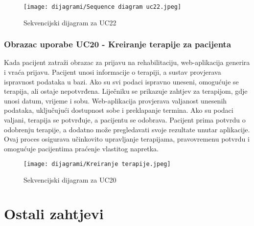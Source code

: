                     \begin{figure}[H]
			         \texttt{[image: dijagrami/Sequence diagram uc22.jpeg]}
			         \centering
			         \caption{Sekvencijski dijagram za UC22}
			         \label{fig:SequenceDiagram2}
		          \end{figure}
                
				\eject
				
				\subsubsection{Obrazac uporabe UC20 - Kreiranje terapije za pacijenta}
				
				
				Kada pacijent zatraži obrazac za prijavu na rehabilitaciju, web-aplikacija generira i vraća prijavu. Pacijent unosi informacije o terapiji, a sustav provjerava ispravnost podataka u bazi. Ako su svi podaci ispravno uneseni, omogućuje se terapija, ali ostaje nepotvrđena. Liječniku se prikazuje zahtjev za terapijom, gdje unosi datum, vrijeme i sobu. Web-aplikacija provjerava valjanost unesenih podataka, uključujući dostupnost sobe i preklapanje termina. Ako su podaci valjani, terapija se potvrđuje, a pacijentu se odobrava. Pacijent prima potvrdu o odobrenju terapije, a dodatno može pregledavati svoje rezultate unutar aplikacije. Ovaj proces osigurava učinkovito upravljanje terapijama, pravovremenu potvrdu i omogućuje pacijentima praćenje vlastitog napretka.
				
				\begin{figure}[H]
					\texttt{[image: dijagrami/Kreiranje terapije.jpeg]}
					\centering
					\caption{Sekvencijski dijagram za UC20}
					\label{fig:SequenceDiagram1}
				\end{figure}
				
				\eject
	
		\section{Ostali zahtjevi}
		 
